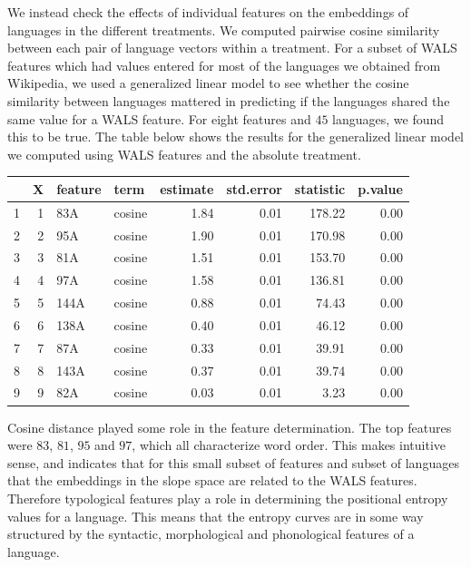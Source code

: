 \documentclass[10pt, letterpaper]{article}
\newenvironment{CodeChunk}{}{}
\begin{document}
We instead check the effects of individual features on the embeddings of
languages in the different treatments. We computed pairwise cosine
similarity between each pair of language vectors within a treatment. For
a subset of WALS features which had values entered for most of the
languages we obtained from Wikipedia, we used a generalized linear model
to see whether the cosine similarity between languages mattered in
predicting if the languages shared the same value for a WALS feature.
For eight features and \(45\) languages, we found this to be true. The
table below shows the results for the generalized linear model we
computed using WALS features and the absolute treatment.

\begin{CodeChunk}
\begin{CodeOutput}
\begin{table}[H]
\centering
\begin{tabular}{rrllrrrr}
  \hline
 & X & feature & term & estimate & std.error & statistic & p.value \\ 
  \hline
1 &   1 & 83A & cosine & 1.84 & 0.01 & 178.22 & 0.00 \\ 
  2 &   2 & 95A & cosine & 1.90 & 0.01 & 170.98 & 0.00 \\ 
  3 &   3 & 81A & cosine & 1.51 & 0.01 & 153.70 & 0.00 \\ 
  4 &   4 & 97A & cosine & 1.58 & 0.01 & 136.81 & 0.00 \\ 
  5 &   5 & 144A & cosine & 0.88 & 0.01 & 74.43 & 0.00 \\ 
  6 &   6 & 138A & cosine & 0.40 & 0.01 & 46.12 & 0.00 \\ 
  7 &   7 & 87A & cosine & 0.33 & 0.01 & 39.91 & 0.00 \\ 
  8 &   8 & 143A & cosine & 0.37 & 0.01 & 39.74 & 0.00 \\ 
  9 &   9 & 82A & cosine & 0.03 & 0.01 & 3.23 & 0.00 \\ 
   \hline
\end{tabular}
\end{table}
\end{CodeOutput}
\end{CodeChunk}

Cosine distance played some role in the feature determination. The top
features were \(83\), \(81\), \(95\) and \(97\), which all characterize
word order. This makes intuitive sense, and indicates that for this
small subset of features and subset of languages that the embeddings in
the slope space are related to the WALS features. Therefore typological
features play a role in determining the positional entropy values for a
language. This means that the entropy curves are in some way structured
by the syntactic, morphological and phonological features of a language.
\end{document}
